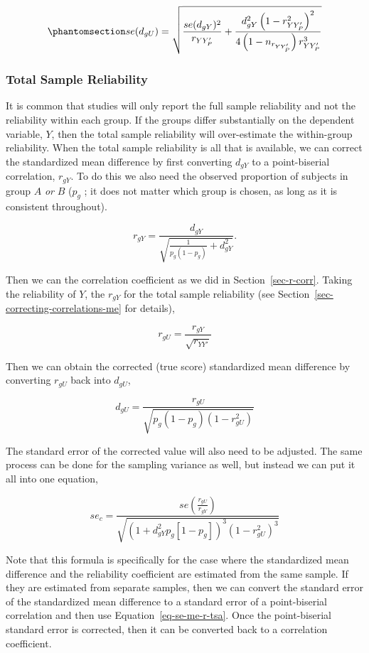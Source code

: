 \documentclass[
  letterpaper,
  DIV=11,
  numbers=noendperiod]{scrreprt}
\begin{document}
\begin{equation}\phantomsection\label{eq-se-me-d-tsa}{
se(d_{gU}) = \sqrt{\frac{se(d_{gY})^2}{r_{YY'_P}} +\frac{d^2_{gY}\left(1-r^2_{YY'_P}\right)^2}{4\left(1-n_{r_{YY'_P}}\right)r^3_{YY'_P}}}
}\end{equation}

\subsubsection*{Total Sample
Reliability}\label{total-sample-reliability}

It is common that studies will only report the full sample reliability
and not the reliability within each group. If the groups differ
substantially on the dependent variable, \(Y\), then the total sample
reliability will over-estimate the within-group reliability. When the
total sample reliability is all that is available, we can correct the
standardized mean difference by first converting \(d_{gY}\) to a
point-biserial correlation, \(r_{gY}\). To do this we also need the
observed proportion of subjects in group \(A\) \emph{or} \(B\) (\(p_g\)
; it does not matter which group is chosen, as long as it is consistent
throughout).

\[
r_{gY} = \frac{d_{gY}}{\sqrt{\frac{1}{p_g(1-p_g)}+d_{gY}^2}}.
\]

Then we can the correlation coefficient as we did in
Section~\ref{sec-r-corr}. Taking the reliability of \(Y\), the
\(r_{gY}\) for the total sample reliability (see
Section~\ref{sec-correcting-correlations-me} for details),

\[
r_{gU} = \frac{r_{gY}}{\sqrt{r_{YY'}}}
\]

Then we can obtain the corrected (true score) standardized mean
difference by converting \(r_{gU}\) back into \(d_{gU}\),

\[
d_{gU} = \frac{r_{gU}}{\sqrt{p_g(1-p_g)(1-r_{gU}^2)}}
\]

The standard error of the corrected value will also need to be adjusted.
The same process can be done for the sampling variance as well, but
instead we can put it all into one equation,

\[
se_{c} = \frac {se\left(\frac{r_{gU}}{r_{gY}}\right)} {\sqrt{\left(1+d_{gY}^2p_g[1-p_g]\right)^3\left(1-r_{gU}^2\right)^3}}
\]

Note that this formula is specifically for the case where the
standardized mean difference and the reliability coefficient are
estimated from the same sample. If they are estimated from separate
samples, then we can convert the standard error of the standardized mean
difference to a standard error of a point-biserial correlation and then
use Equation~\ref{eq-se-me-r-tsa}. Once the point-biserial standard
error is corrected, then it can be converted back to a correlation
coefficient.
\end{document}

